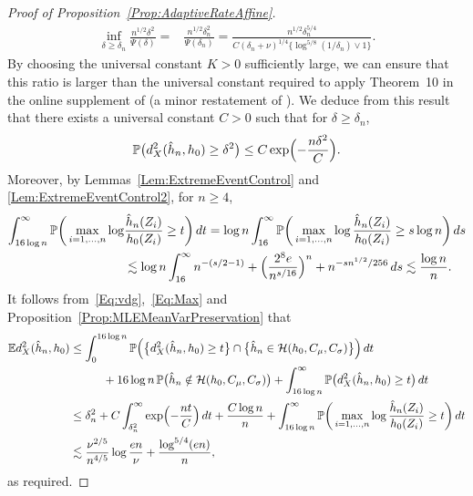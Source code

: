 \documentclass[a4paper,12pt]{article}
\begin{document}
\begin{proof}[Proof of Proposition~\ref{Prop:AdaptiveRateAffine}]
\begin{align*}
  \inf_{\delta \geq \delta_n} \frac{n^{1/2}\delta^2}{\Psi(\delta)} = & \frac{n^{1/2}\delta_n^2}{\Psi(\delta_n)} = \frac{n^{1/2}\delta_n^{5/4}}{C(\delta_n+\nu)^{1/4}\{ \log^{5/8} (1/\delta_n) \vee 1\}}.
\end{align*}
By choosing the universal constant $K > 0$ sufficiently large, we can ensure that this ratio is larger than the universal constant required to apply Theorem~10 in the online supplement of \citet{kim2016adaptationsupp} (a minor restatement of \citet[][Corollary~7.5]{vandegeer2000empirical}).  We deduce from this result that there exists a universal constant $C > 0$ such that for $\delta \geq \delta_n$,
\begin{equation}
\label{Eq:vdg}
\mathbb{P}\bigl(d_X^2(\hat{h}_n,h_0) \geq \delta^2\bigr) \leq C\exp\Bigl(-\frac{n\delta^2}{C}\Bigr).
\end{equation}
Moreover, by Lemmas~\ref{Lem:ExtremeEventControl} and \ref{Lem:ExtremeEventControl2}, for $n \geq 4$, 
\begin{align}
\label{Eq:Max}
  \int_{16 \log n}^\infty \mathbb{P}\bigg( \max_{i=1,\ldots,n} \log &\frac{\hat{h}_n(Z_i)}{h_0(Z_i)}  \geq t \bigg) \, dt
  = \log n \int_{16}^\infty  \mathbb{P}\bigg( \max_{i=1,\ldots,n} \log \frac{\hat{h}_n(Z_i)}{h_0(Z_i)}  \geq s\log n \bigg) \, ds \nonumber \\
  &\lesssim \log n \int_{16}^\infty n^{-(s/2-1)} + \Bigl(\frac{2^8 e}{n^{s/16}}\Bigr)^n + n^{-s n^{1/2}/256} \, ds \lesssim \frac{\log n}{n}.
\end{align}
It follows from~\eqref{Eq:vdg},~\eqref{Eq:Max} and Proposition~\ref{Prop:MLEMeanVarPreservation} that
\begin{align*}
   \mathbb{E} d_X^2( \hat{h}_n, h_0) 
  & \leq  \int_0^{16 \log n}  \mathbb{P}\Big( \bigl\{d_X^2(\hat{h}_n, h_0) \geq t\bigr\} \cap
         \bigl\{\hat{h}_n \in \mathcal{H}(h_0, C_\mu, C_\sigma)\bigr\} \Big) \, dt  \\
  & \hspace{1cm}+ 16 \log n \, \mathbb{P}\bigl( \hat{h}_n \notin \mathcal{H}(h_0, C_\mu, C_\sigma)\bigr) +
    \int_{16 \log n}^\infty \mathbb{P}\big( d_X^2(\hat{h}_n, h_0) \geq t \big) \, dt
  \\
  &\leq  \delta_n^2 + C \int_{\delta_n^2}^{\infty} \exp\Bigl(-\frac{nt}{C}\Bigr) \, dt + \frac{C \log n}{n} +
         \int_{16 \log n}^\infty \mathbb{P}\bigg( \max_{i=1,\ldots,n} \log \frac{\hat{h}_n(Z_i)}{h_0(Z_i)}  \geq t \bigg) \, dt \\
&\lesssim \frac{\nu^{2/5}}{n^{4/5}}\log\frac{en}{\nu} + \frac{\log^{5/4}(en)}{n},
\end{align*}
as required.
\end{proof}
\end{document}
